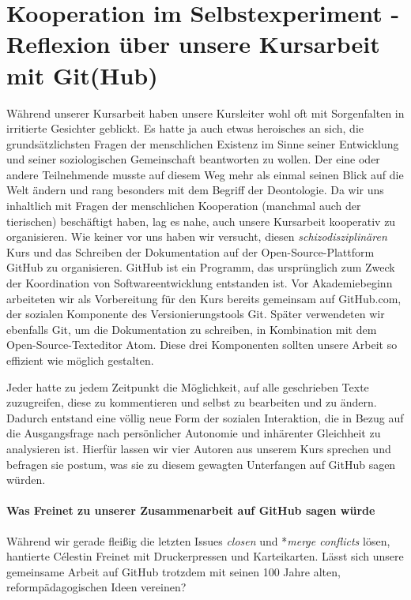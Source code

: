 \section[Kursreflexion]{Kooperation im Selbstexperiment - Reflexion über unsere Kursarbeit mit Git(Hub)}

Während unserer Kursarbeit haben unsere Kursleiter wohl oft mit Sorgenfalten in irritierte Gesichter geblickt.
Es hatte ja auch etwas heroisches an sich, die grundsätzlichsten Fragen der menschlichen Existenz im Sinne seiner Entwicklung und seiner soziologischen Gemeinschaft beantworten zu wollen.
Der eine oder andere Teilnehmende musste auf diesem Weg mehr als einmal seinen Blick auf die Welt ändern und rang besonders mit dem Begriff der Deontologie.
Da wir uns inhaltlich mit Fragen der menschlichen Kooperation (manchmal auch der tierischen) beschäftigt haben, lag es nahe, auch unsere Kursarbeit kooperativ zu organisieren.
Wie keiner vor uns haben wir versucht, diesen \emph{schizodisziplinären} Kurs und das Schreiben der Dokumentation auf der Open-Source-Plattform GitHub zu organisieren.
GitHub ist ein Programm, das ursprünglich zum Zweck der Koordination von Softwareentwicklung entstanden ist.
Vor Akademiebeginn arbeiteten wir als Vorbereitung für den Kurs bereits gemeinsam auf GitHub.com, der sozialen Komponente des Versionierungstools Git.
Später verwendeten wir ebenfalls Git, um die Dokumentation zu schreiben, in Kombination mit dem Open-Source-Texteditor Atom.
Diese drei Komponenten sollten unsere Arbeit so effizient wie möglich gestalten.

Jeder hatte zu jedem Zeitpunkt die Möglichkeit, auf alle geschrieben Texte zuzugreifen, diese zu kommentieren und selbst zu bearbeiten und zu ändern.
Dadurch entstand eine völlig neue Form der sozialen Interaktion, die in Bezug auf die Ausgangsfrage nach persönlicher Autonomie und inhärenter Gleichheit zu analysieren ist.
Hierfür lassen wir vier Autoren aus unserem Kurs sprechen und befragen sie postum, was sie zu diesem gewagten Unterfangen auf GitHub sagen würden.


\paragraph{Was Freinet zu unserer Zusammenarbeit auf GitHub sagen würde}

Während wir gerade fleißig die letzten Issues \emph{closen} und *\emph{merge conflicts} lösen, hantierte Célestin Freinet mit Druckerpressen und Karteikarten.
Lässt sich unsere gemeinsame Arbeit auf GitHub trotzdem mit seinen 100 Jahre alten, reformpädagogischen Ideen vereinen?

